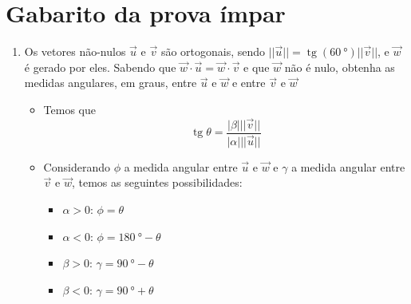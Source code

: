 \documentclass[brazilian, fleqn]{article}
\DeclareMathOperator{\tg}{tg}
\renewcommand{\vec}[1]{\overrightarrow{#1}}
\begin{document}
\section*{\centering Gabarito da prova ímpar}

\begin{enumerate}
    \item Os vetores não-nulos \(\vec{u}\) e \(\vec{v}\) são ortogonais, sendo \(||\vec{u}||=\tg{(\SI{60}{\degree})} ||\vec{v}||\), e
        \(\vec{w}\) é gerado por eles. Sabendo que \(\vec{w} \cdot \vec{u} = \vec{w} \cdot \vec{v} \) e que \(\vec{w}\)
        não é nulo, obtenha as medidas angulares, em graus, entre \(\vec{u}\) e \(\vec{w}\) e entre \(\vec{v}\) e
        \(\vec{w}\)

        \begin{tcolorbox}

            \begin{minipage}{0.45\textwidth}
                \begin{itemize}
                    \item Temos que
                        \[
                            \tg{\theta} = \frac{|\beta| ||\vec{v}||}{|\alpha| ||\vec{u}||}
                        \]

                    \item Considerando \(\phi\) a medida angular entre \(\vec{u}\) e \(\vec{w}\) e
                        \(\gamma\) a medida angular entre \(\vec{v}\) e \(\vec{w}\), temos as seguintes possibilidades:
                        \begin{itemize}[label={$\rightarrow$}]
                            \item \(\alpha > 0\): \(\phi = \theta\)
                            \item \(\alpha < 0\): \(\phi = \SI{180}{\degree} - \theta\)
                            \item \(\beta > 0\): \(\gamma = \SI{90}{\degree}-\theta\)
                            \item \(\beta < 0\): \(\gamma = \SI{90}{\degree} + \theta\)
                        \end{itemize}
                \end{itemize}
            \end{minipage}
            \begin{minipage}{0.45\textwidth}
                \begin{center}
                \end{center}
            \end{minipage}


\end{tcolorbox}
\end{enumerate}
\end{document}
